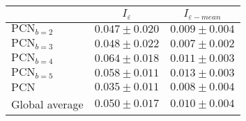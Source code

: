 \begin{tabular}{|l|c|c|}
    \hline
        & $I_\varepsilon$ & $I_{\varepsilon-mean}$ \\
    \hline
    $\text{PCN}_{b=2}$ & $0.047 \pm 0.020$ & $0.009 \pm 0.004$ \\
    \hline
    $\text{PCN}_{b=3}$ & $0.048 \pm 0.022$ & $0.007 \pm 0.002$ \\
    \hline
    $\text{PCN}_{b=4}$ & $0.064 \pm 0.018$ & $0.011 \pm 0.003$ \\
    \hline
    $\text{PCN}_{b=5}$ & $0.058 \pm 0.011$ & $0.013 \pm 0.003$ \\
    \hline
    $\text{PCN}$ & $0.035 \pm 0.011$ & $0.008 \pm 0.004$ \\
    \hline
    \hline
    Global average & $0.050 \pm 0.017$ & $0.010 \pm 0.004$ \\
    \hline
\end{tabular}